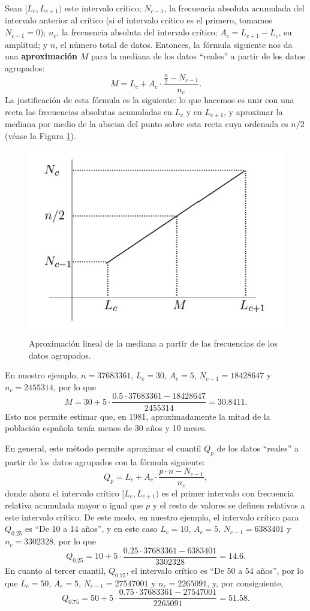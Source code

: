 \documentclass[
]{book}
\theoremstyle{definition}
\theoremstyle{definition}
\theoremstyle{definition}
\theoremstyle{remark}
\begin{document}
Sean \([L_c, L_{c+1})\) este intervalo crítico; \(N_{c-1}\), la frecuencia absoluta acumulada del intervalo anterior al crítico (si el intervalo crítico es el primero, tomamos \(N_{c-1}=0\)); \(n_c\), la frecuencia absoluta del intervalo crítico; \(A_c=L_{c+1}-L_c\), su amplitud; y \(n\), el número total de datos. Entonces, la fórmula siguiente nos da una \textbf{aproximación} \(M\) para la mediana de los datos ``reales'' a partir de los datos agrupados:
\[
M=L_{c}+A_c\cdot \frac{\frac{n}{2}- N_{c-1}}{n_c}.
\]
La justificación de esta fórmula es la siguiente: lo que hacemos es unir con una recta las frecuencias absolutas acumuladas en \(L_c\) y en \(L_{c+1}\), y aproximar la mediana por medio de la abscisa del punto sobre esta recta cuya ordenada es \(n/2\) (véase la Figura \ref{fig:median}).

\begin{figure}

{\centering \includegraphics[width=0.6\linewidth]{AprendeR-Parte-I_files/figure-html/median} 

}

\caption{Aproximación lineal de la mediana a partir de las frecuencias de los datos agrupados.}\label{fig:median}
\end{figure}

En nuestro ejemplo, \(n=37683361\), \(L_c=30\), \(A_c=5\), \(N_{c-1}=18428647\) y \(n_c=2455314\), por lo que
\[
M=30+5\cdot\frac{0.5\cdot 37683361-18428647}{2455314}= 30.8411.
\]
Esto nos permite estimar que, en 1981, aproximadamente la mitad de la población española tenía menos de 30 años y 10 meses.

En general, este método permite aproximar el cuantil \(Q_p\) de los datos ``reales'' a partir de los datos agrupados con la fórmula siguiente:
\[
Q_{p} =L_c + A_c \cdot \frac{p\cdot n-N_{c-1}}{n_c},
\]
donde ahora el intervalo crítico \([L_c,L_{c+1})\) es el primer intervalo con frecuencia relativa acumulada mayor o igual que \(p\)
y el resto de valores se definen relativos a este intervalo crítico.
De este modo, en nuestro ejemplo, el intervalo crítico para \(Q_{0.25}\) es ``De 10 a 14 años'', y en este caso \(L_c=10\), \(A_c=5\), \(N_{c-1}=6383401\) y \(n_c=3302328\), por lo que
\[
Q_{0.25}=10+5\cdot\frac{0.25\cdot 37683361-6383401}{3302328}= 14.6.
\]
En cuanto al tercer cuantil, \(Q_{0.75}\), el intervalo crítico es ``De 50 a 54 años'', por lo que \(L_c=50\), \(A_c=5\), \(N_{c-1}=27547001\) y \(n_c=2265091\), y, por consiguiente,
\[
Q_{0.75}=50+5\cdot\frac{0.75\cdot 37683361-27547001}{2265091}=51.58.
\]
\end{document}
